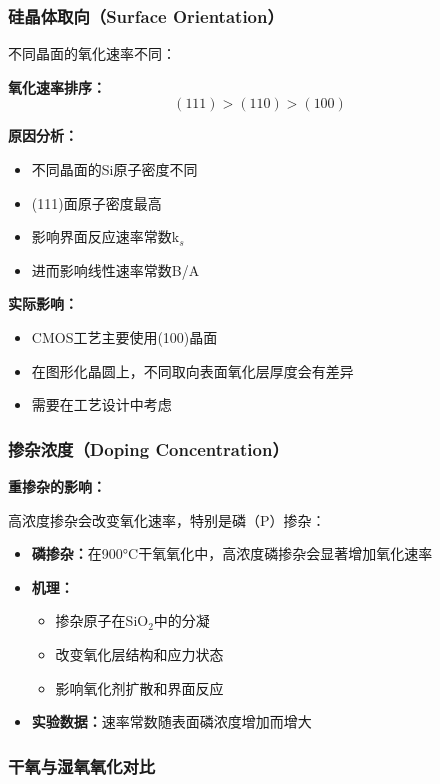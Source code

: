 \documentclass[UTF8,12pt,a4paper]{ctexart}
\begin{document}
\subsubsection{硅晶体取向（Surface Orientation）}

不同晶面的氧化速率不同：

\textbf{氧化速率排序：}
\begin{equation}
(111) > (110) > (100)
\end{equation}

\textbf{原因分析：}
\begin{itemize}
    \item 不同晶面的Si原子密度不同
    \item (111)面原子密度最高
    \item 影响界面反应速率常数k$_s$
    \item 进而影响线性速率常数B/A
\end{itemize}

\textbf{实际影响：}
\begin{itemize}
    \item CMOS工艺主要使用(100)晶面
    \item 在图形化晶圆上，不同取向表面氧化层厚度会有差异
    \item 需要在工艺设计中考虑
\end{itemize}

\subsubsection{掺杂浓度（Doping Concentration）}

\textbf{重掺杂的影响：}

高浓度掺杂会改变氧化速率，特别是磷（P）掺杂：

\begin{itemize}
    \item \textbf{磷掺杂：}在900°C干氧氧化中，高浓度磷掺杂会显著增加氧化速率
    \item \textbf{机理：}
    \begin{itemize}
        \item 掺杂原子在SiO$_2$中的分凝
        \item 改变氧化层结构和应力状态
        \item 影响氧化剂扩散和界面反应
    \end{itemize}
    \item \textbf{实验数据：}速率常数随表面磷浓度增加而增大
\end{itemize}

\subsubsection{干氧与湿氧氧化对比}
\end{document}
